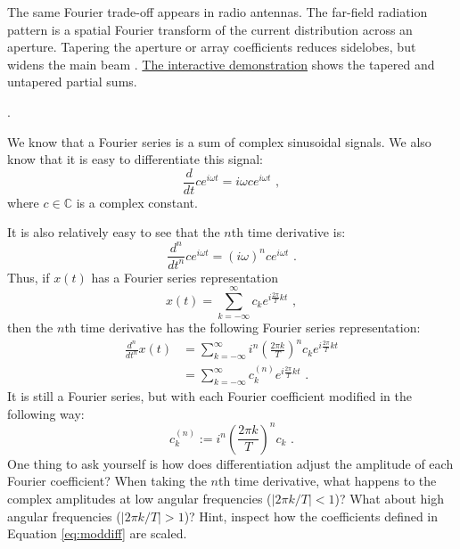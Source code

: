 The same Fourier trade-off appears in radio antennas. The far-field radiation pattern is a spatial Fourier transform of the current distribution across an aperture. Tapering the aperture or array coefficients reduces sidelobes, but widens the main beam \cite{dolph1946current,taylor1955line}. \href{https://juha.no/signal/gibbs-phenomenon/}{The interactive demonstration} shows the tapered and untapered partial sums.

.

We know that a Fourier series is a sum of complex sinusoidal signals. We also know that it is easy to differentiate this signal:
\begin{equation}
  \frac{d}{d t} c e^{i\omega t}=i\omega c e^{i\omega t}\,\,,
\end{equation}
where $c \in \mathbb{C}$ is a complex constant.

It is also relatively easy to see that the $n$th time derivative is:
\begin{equation}
  \frac{d^n}{dt^n}ce^{i\omega t} = (i\omega)^n c e^{i\omega t} \,\,.
\end{equation}
Thus, if $x(t)$ has a Fourier series representation
\begin{equation}
  x(t) = \sum_{k=-\infty}^{\infty} c_k e^{i\frac{2\pi}{T}kt}\,\,,
\end{equation}
then the $n$th time derivative has the following Fourier series representation:
\begin{align}
  \frac{d^n}{dt^n} x(t) & = \sum_{k=-\infty}^{\infty} i^n \left(\frac{2\pi k}{T}\right)^n c_k e^{i\frac{2\pi}{T}kt} \\
                        & = \sum_{k=-\infty}^{\infty} c^{(n)}_k e^{i\frac{2\pi}{T}kt} \,\,.
\end{align}
It is still a Fourier series, but with each Fourier coefficient modified in the following way:
\begin{equation}
  c_k^{(n)} := i^n \left(\frac{2\pi k}{T}\right)^n c_k \,\,.
  \label{eq:moddiff}
\end{equation}
One thing to ask yourself is how does differentiation adjust the
amplitude of each Fourier coefficient?  When taking the $n$th time
derivative, what happens to the complex amplitudes at low angular
frequencies ($|2\pi k/T| < 1$)? What about high angular frequencies
($|2\pi k/T| > 1$)?  Hint, inspect how the coefficients defined in
Equation \ref{eq:moddiff} are scaled.

